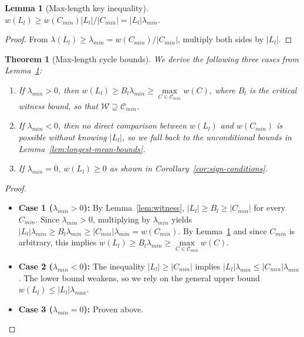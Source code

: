 \documentclass{article}
\newtheorem{thm}{Theorem}[section]
\newtheorem{lem}{Lemma}[section]
\theoremstyle{definition}
\begin{document}
\begin{lem}[Max-length key inequality]
\label{lem:max-length-key}
$w(L_l) \geq w(C_{min})|L_l| / |C_{min}| = |L_l|\lambda_{min}$.
\end{lem}

\begin{proof}
From $\lambda(L_l) \geq \lambda_{min} = w(C_{min})/|C_{min}|$, multiply
both sides by $|L_l|$.
\end{proof}

\begin{thm}[Max-length cycle bounds]
  \label{thm:max-length}
  We derive the following three cases from
  Lemma~\ref{lem:max-length-key}:
  \begin{enumerate}
    \item If $\lambda_{min} > 0$, then $w(L_l) \geq B_l\lambda_{min}
      \geq \max\limits_{C \in \mathcal{C}_{min}} w(C)$, where $B_l$ is
      the critical witness bound, so that $\mathcal{W} \supseteq
      \mathcal{C}_{min}$.
    \item If $\lambda_{min} < 0$, then no direct comparison between
      $w(L_l)$ and $w(C_{min})$ is possible without knowing $|L_l|$,
      so we fall back to the unconditional bounds in
      Lemma~\ref{lem:longest-mean-bounds}.
    \item If $\lambda_{min} = 0$, $w(L_l) \geq 0$ as shown in
      Corollary~\ref{cor:sign-conditions}.
\end{enumerate}
\end{thm}

\begin{proof}
\mbox{}\par
\begin{itemize}
  \item \textbf{Case 1 ($\lambda_{min} > 0$):} By
    Lemma~\ref{lem:witness}, $|L_l| \geq B_l \geq |C_{min}|$ for every
    $C_{min}$. Since $\lambda_{min} > 0$, multiplying by
    $\lambda_{min}$ yields $|L_l|\lambda_{min} \geq B_l\lambda_{min}
    \geq |C_{min}|\lambda_{min} = w(C_{min})$. By
    Lemma~\ref{lem:max-length-key} and since $C_{min}$ is arbitrary,
    this implies $w(L_l) \geq B_l\lambda_{min} \geq \max\limits_{C \in
      \mathcal{C}_{min}} w(C)$.
  \item \textbf{Case 2 ($\lambda_{min} < 0$):} The inequality $|L_l|
    \geq |C_{min}|$ implies $|L_l|\lambda_{min} \leq
    |C_{min}|\lambda_{min}$. The lower bound weakens, so we rely on
    the general upper bound $w(L_l) \leq |L_l|\lambda_{max}$.
  \item \textbf{Case 3 ($\lambda_{min} = 0$):} Proven above.
\end{itemize}
\end{proof}
\end{document}
